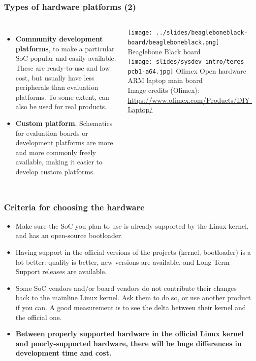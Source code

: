 \begin{frame}
  \frametitle{Types of hardware platforms (2)}
  \begin{columns}
  \begin{itemize}
  \item {\bf Community development platforms}, to make a
    particular SoC popular and easily available. These are
    ready-to-use and low cost, but usually have less peripherals than
    evaluation platforms. To some extent, can also be used for real
    products.
  \item {\bf Custom platform}. Schematics for evaluation boards or
    development platforms are more and more commonly freely available,
    making it easier to develop custom platforms.
  \end{itemize}
    \texttt{[image: ../slides/beagleboneblack-board/beagleboneblack.png]}
    \scriptsize
    Beaglebone Black board\\
    \vspace{0.5cm}
    \texttt{[image: slides/sysdev-intro/teres-pcb1-a64.jpg]}
    \scriptsize
    Olimex Open hardware ARM laptop main board\\
    \tiny
    Image credits (Olimex):\\
    \url{https://www.olimex.com/Products/DIY-Laptop/}
  \end{columns}
\end{frame}

\begin{frame}
  \frametitle{Criteria for choosing the hardware}
  \begin{itemize}
  \item Make sure the SoC you plan to use is already supported by
    the Linux kernel, and has an open-source bootloader.
  \item Having support in the official versions of the projects
    (kernel, bootloader) is a lot better: quality is better, new
    versions are available, and Long Term Support releases are
    available.
  \item Some SoC vendors and/or board vendors do not contribute their
    changes back to the mainline Linux kernel. Ask them to do so, or
    use another product if you can. A good measurement is to see the
    delta between their kernel and the official one.
  \item {\bf Between properly supported hardware in the official Linux
      kernel and poorly-supported hardware, there will be huge
      differences in development time and cost.}
  \end{itemize}
\end{frame}

